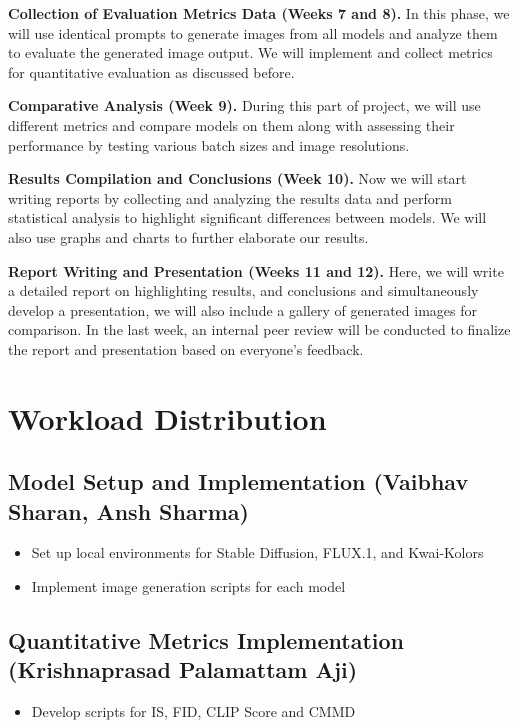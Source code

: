 \documentclass{article}
\begin{document}
\textbf{Collection of Evaluation Metrics Data (Weeks 7 and 8).}
In this phase, we will use identical prompts to generate images from all models and
analyze them to evaluate the generated image output. We will implement and collect metrics for quantitative evaluation as discussed before.

\textbf{Comparative Analysis (Week 9).}
During this part of project, we will use different metrics and compare models on them along with assessing their performance by testing various batch sizes and image resolutions.

\textbf{Results Compilation and Conclusions (Week 10).}
Now we will start writing reports by collecting and analyzing the results data and perform
statistical analysis to highlight significant differences between models. We will also use
graphs and charts to further elaborate our results.

\textbf{Report Writing and Presentation (Weeks 11 and 12).}
Here, we will write a detailed report on highlighting results, and conclusions and simultaneously develop a presentation, we will also include a gallery of generated images for comparison. In the last week, an internal peer review will be conducted to finalize the report and presentation based on everyone’s feedback.



\section{Workload Distribution}

\subsection{Model Setup and Implementation (Vaibhav Sharan, Ansh Sharma)}
\begin{itemize}
    \item Set up local environments for Stable Diffusion, FLUX.1, and Kwai-Kolors
    \item Implement image generation scripts for each model
\end{itemize}

\subsection{Quantitative Metrics Implementation (Krishnaprasad Palamattam Aji)}
\begin{itemize}
    \item Develop scripts for IS, FID, CLIP Score and CMMD
\end{itemize}
\end{document}
